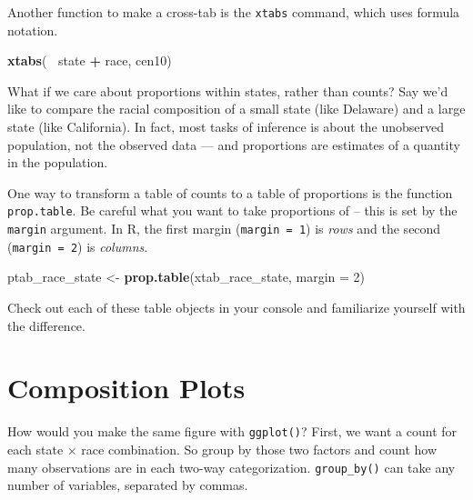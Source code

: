 \documentclass[]{book}
\newenvironment{Shaded}{\begin{snugshade}}{\end{snugshade}}
\newcommand{\KeywordTok}[1]{\textcolor[rgb]{0.13,0.29,0.53}{\textbf{#1}}}
\newcommand{\DataTypeTok}[1]{\textcolor[rgb]{0.13,0.29,0.53}{#1}}
\newcommand{\DecValTok}[1]{\textcolor[rgb]{0.00,0.00,0.81}{#1}}
\newcommand{\StringTok}[1]{\textcolor[rgb]{0.31,0.60,0.02}{#1}}
\newcommand{\OperatorTok}[1]{\textcolor[rgb]{0.81,0.36,0.00}{\textbf{#1}}}
\newcommand{\NormalTok}[1]{#1}
\theoremstyle{definition}
\theoremstyle{definition}
\theoremstyle{definition}
\theoremstyle{remark}
\begin{document}
Another function to make a cross-tab is the \texttt{xtabs} command,
which uses formula notation.

\begin{Shaded}
\begin{Highlighting}[]
\KeywordTok{xtabs}\NormalTok{(}\OperatorTok{~}\StringTok{ }\NormalTok{state }\OperatorTok{+}\StringTok{ }\NormalTok{race, cen10)}
\end{Highlighting}
\end{Shaded}

What if we care about proportions within states, rather than counts? Say
we'd like to compare the racial composition of a small state (like
Delaware) and a large state (like California). In fact, most tasks of
inference is about the unobserved population, not the observed data ---
and proportions are estimates of a quantity in the population.

One way to transform a table of counts to a table of proportions is the
function \texttt{prop.table}. Be careful what you want to take
proportions of -- this is set by the \texttt{margin} argument. In R, the
first margin (\texttt{margin\ =\ 1}) is \emph{rows} and the second
(\texttt{margin\ =\ 2}) is \emph{columns}.

\begin{Shaded}
\begin{Highlighting}[]
\NormalTok{ptab_race_state <-}\StringTok{ }\KeywordTok{prop.table}\NormalTok{(xtab_race_state, }\DataTypeTok{margin =} \DecValTok{2}\NormalTok{)}
\end{Highlighting}
\end{Shaded}

Check out each of these table objects in your console and familiarize
yourself with the difference.

\section{Composition Plots}\label{composition-plots}

How would you make the same figure with \texttt{ggplot()}? First, we
want a count for each state \(\times\) race combination. So group by
those two factors and count how many observations are in each two-way
categorization. \texttt{group\_by()} can take any number of variables,
separated by commas.

\begin{Shaded}
\end{Shaded}
\end{document}
